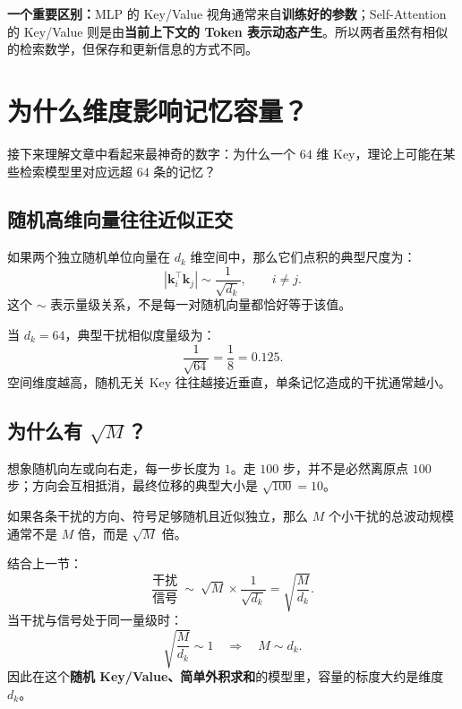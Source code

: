 \documentclass[11pt,a4paper,UTF8]{ctexart}
\numberwithin{equation}{section}
\newcommand{\vect}[1]{\boldsymbol{#1}}
\begin{document}
\begin{warningbox}
\textbf{一个重要区别：}MLP 的 Key/Value 视角通常来自\textbf{训练好的参数}；Self-Attention 的 Key/Value 则是由\textbf{当前上下文的 Token 表示动态产生}。所以两者虽然有相似的检索数学，但保存和更新信息的方式不同。
\end{warningbox}

\section{为什么维度影响记忆容量？}

接下来理解文章中看起来最神奇的数字：为什么一个 $64$ 维 Key，理论上可能在某些检索模型里对应远超 $64$ 条的记忆？

\subsection{随机高维向量往往近似正交}
如果两个独立随机单位向量在 $d_k$ 维空间中，那么它们点积的典型尺度为：
\begin{equation}
|\vect{k}_i^\top\vect{k}_j|\sim\frac{1}{\sqrt{d_k}},\qquad i\ne j.
\end{equation}
这个 $\sim$ 表示量级关系，不是每一对随机向量都恰好等于该值。

当 $d_k=64$，典型干扰相似度量级为：
\[
\frac{1}{\sqrt{64}}=\frac18=0.125.
\]
空间维度越高，随机无关 Key 往往越接近垂直，单条记忆造成的干扰通常越小。

\subsection{为什么有 \texorpdfstring{$\sqrt M$}{√M}？}
想象随机向左或向右走，每一步长度为 $1$。走 $100$ 步，并不是必然离原点 $100$ 步；方向会互相抵消，最终位移的典型大小是 $\sqrt{100}=10$。

如果各条干扰的方向、符号足够随机且近似独立，那么 $M$ 个小干扰的总波动规模通常不是 $M$ 倍，而是 $\sqrt M$ 倍。

结合上一节：
\begin{equation}
\boxed{\frac{\text{干扰}}{\text{信号}}\ \sim\ \sqrt M\times\frac{1}{\sqrt{d_k}}
=\sqrt{\frac{M}{d_k}}.}
\end{equation}
当干扰与信号处于同一量级时：
\begin{equation}
\sqrt{\frac{M}{d_k}}\sim1\quad\Rightarrow\quad M\sim d_k.
\end{equation}
因此在这个\textbf{随机 Key/Value、简单外积求和}的模型里，容量的标度大约是维度 $d_k$。
\end{document}
